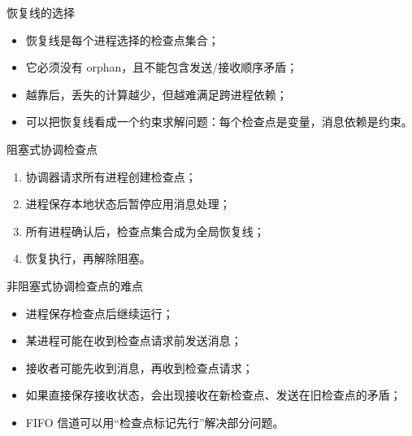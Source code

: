 \documentclass[UTF8,fontset=none,aspectratio=169,10pt]{beamer}
\begin{document}
\begin{frame}{恢复线的选择}
\begin{itemize}
  \item 恢复线是每个进程选择的检查点集合；
  \item 它必须没有 orphan，且不能包含发送/接收顺序矛盾；
  \item 越靠后，丢失的计算越少，但越难满足跨进程依赖；
  \item 可以把恢复线看成一个约束求解问题：每个检查点是变量，消息依赖是约束。
\end{itemize}
\end{frame}


\begin{frame}{阻塞式协调检查点}
\begin{enumerate}
  \item 协调器请求所有进程创建检查点；
  \item 进程保存本地状态后暂停应用消息处理；
  \item 所有进程确认后，检查点集合成为全局恢复线；
  \item 恢复执行，再解除阻塞。
\end{enumerate}
\vfill
{}
\end{frame}

\begin{frame}{非阻塞式协调检查点的难点}
\begin{itemize}
  \item 进程保存检查点后继续运行；
  \item 某进程可能在收到检查点请求前发送消息；
  \item 接收者可能先收到消息，再收到检查点请求；
  \item 如果直接保存接收状态，会出现接收在新检查点、发送在旧检查点的矛盾；
  \item FIFO 信道可以用“检查点标记先行”解决部分问题。
\end{itemize}
\end{frame}
\end{document}
